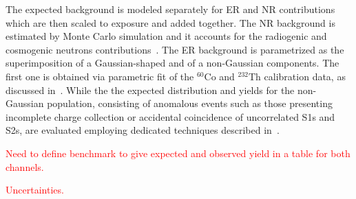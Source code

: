 The expected background is modeled separately for ER and NR contributions which are then scaled to exposure and added together.
The NR background is estimated by Monte Carlo simulation and it accounts for the radiogenic and cosmogenic neutrons
contributions~\cite{Aprile:2013tov}.
The ER background is parametrized as the superimposition of a Gaussian-shaped and of a non-Gaussian components.
The first one is obtained via  parametric fit of the $^{60}$Co and $^{232}$Th calibration data, as discussed in~\cite{xe100_run10_si}.
While the the expected distribution and yields for the non-Gaussian population, consisting of anomalous events such as those 
presenting incomplete charge collection or accidental coincidence of uncorrelated S1s and S2s,  
are evaluated employing dedicated techniques described in~\cite{xe100_run_combination}.

\textcolor{red}{Need to define benchmark to give expected and observed yield in a table for both channels.}

\textcolor{red}{Uncertainties.} 
